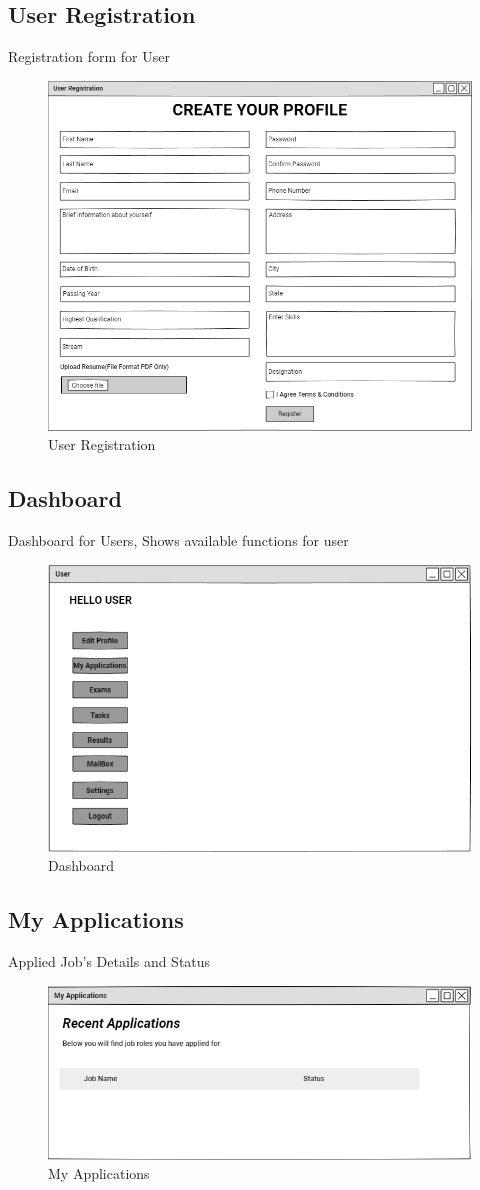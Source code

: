 \documentclass[a4paper,12pt]{report}
\begin{document}
\subsection {User Registration}
Registration form for User
\begin{figure}[bph]
	\centering
	\includegraphics[width=.6\linewidth ]{img/user/user_registration}
	\caption{User Registration}
\end{figure}
\pagebreak

\subsection {Dashboard}
Dashboard for Users, Shows available functions for user
\begin{figure}[bph]
	\centering
	\includegraphics[width=.8\linewidth]{img/user/userhompage}
	\caption{Dashboard}
\end{figure}
\subsection {My Applications}
Applied Job's Details and Status
\begin{figure}[bph]
	\centering
	\includegraphics[width=.7\linewidth]{img/user/useraplictns}
	\caption{My Applications}
\end{figure}
\pagebreak
\end{document}
